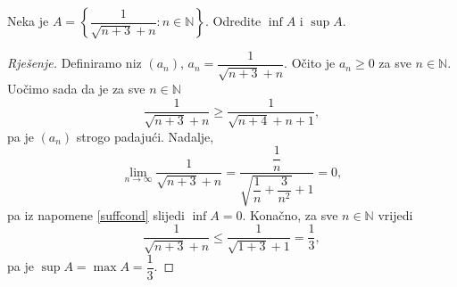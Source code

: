 \begin{exercise}
Neka je $A=\left\{\dfrac{1}{\sqrt{n+3}+n} : n\in \mathbb{N}\right\}$. Odredite $\inf{A}$ i $\sup{A}$.
\end{exercise}
\begin{proof}[Rješenje]
Definiramo niz $(a_n)$, $a_n=\dfrac{1}{\sqrt{n+3}+n}$. Očito je $a_n\geq 0$ za sve $n\in \mathbb{N}$. Uočimo sada da je za sve $n\in \mathbb{N}$
$$\dfrac{1}{\sqrt{n+3}+n}\geq \dfrac{1}{\sqrt{n+4}+n+1},$$
pa je $(a_n)$ strogo padajući. Nadalje,
$$\lim\limits_{n\to \infty}{\dfrac{1}{\sqrt{n+3}+n}}=\dfrac{\dfrac{1}{n}}{\sqrt{\dfrac{1}{n}+\dfrac{3}{n^2}}+1}=0,$$
pa iz napomene \ref{suffcond} slijedi $\inf{A}=0$. Konačno, za sve $n\in \mathbb{N}$ vrijedi
$$\dfrac{1}{\sqrt{n+3}+n}\leq \dfrac{1}{\sqrt{1+3}+1}=\dfrac{1}{3},$$
pa je $\sup{A}=\max{A}=\dfrac{1}{3}$.
\end{proof}

